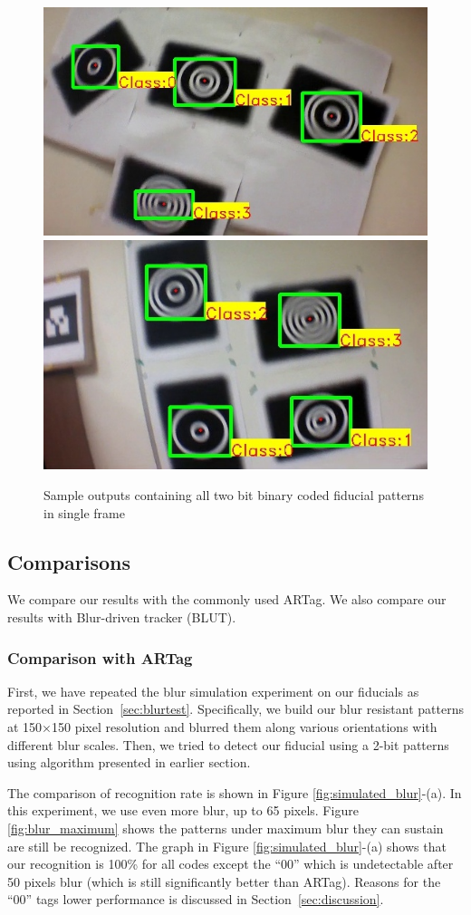 \documentclass[runningheads]{llncs}
\begin{document}
\begin{figure}[ht!]
\centering
  \includegraphics[width=.45\linewidth]{output_all_2.jpg}
  \includegraphics[width=.45\linewidth]{new_results/output_test_all1.jpg}
  \caption{Sample outputs containing all two bit binary coded fiducial patterns
  in single frame}
  \label{fig:output_all}
\end{figure}

\subsection{Comparisons}

We compare our results with the commonly used ARTag. We also compare
our results with Blur-driven tracker (BLUT)\cite{Wu:2011}.
\subsubsection{Comparison with ARTag}
First, we have repeated the blur simulation experiment on our fiducials as reported
in Section~\ref{sec:blurtest}.  Specifically, we build our blur resistant
patterns at 150$\times$150 pixel resolution and blurred them along various
orientations with different blur scales. Then, we tried to detect our fiducial using a 2-bit
patterns using algorithm presented in earlier section.

The comparison of recognition rate is shown in Figure
\ref{fig:simulated_blur}-(a). In this experiment, we use even more blur, up to 65
pixels. Figure \ref{fig:blur_maximum} shows the patterns under maximum blur they
can sustain are still be recognized. The graph in Figure
\ref{fig:simulated_blur}-(a) shows that our recognition is 100\% for all codes
except the ``00'' which is undetectable after 50 pixels blur (which is still
significantly better than ARTag).  Reasons for the ``00'' tags lower
performance is discussed in Section~\ref{sec:discussion}.
\end{document}
